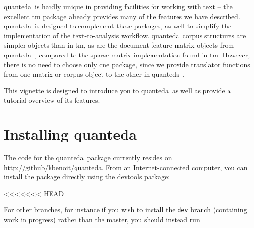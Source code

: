 \documentclass[11pt]{article}
\newcommand{\quanteda}{\textsf{quanteda}\ }
\begin{document}
\quanteda is hardly unique in providing facilities for working with
text -- the excellent \textsf{tm} package already provides many of the
features we have described.  \quanteda is designed to complement those
packages, as well to simplify the implementation of the
text-to-analysis workflow.  \quanteda corpus structures are simpler
objects than in \textsf{tm}, as are the document-feature matrix
objects from \quanteda, compared to the sparse matrix implementation
found in \textsf{tm}.  However, there is no need to choose only one
package, since we provide translator functions from one matrix or
corpus object to the other in \quanteda.

This vignette is designed to introduce you to \quanteda as well as
provide a tutorial overview of its features.

\section{Installing \quanteda}

The code for the \quanteda package currently resides on
\url{http://github/kbenoit/quanteda}.  From an Internet-connected
computer, you can install the package directly using the
\textsf{devtools} package:

<<<<<<< HEAD
\begin{knitrout}
\color{fgcolor}\begin{kframe}
\begin{alltt}
 \hlstd{(}\hlopt{!} \hlstd{(}\hlstd{,}  \hlstd{=} \hlstd{)}
\end{alltt}
\end{kframe}
\end{knitrout}


For other branches, for instance if you wish to install the
\texttt{dev} branch (containing work in progress) rather than the
master, you should instead run

\begin{knitrout}
\color{fgcolor}\begin{kframe}
\begin{alltt}
\hlstd{(}\hlstd{,}  \hlstd{=} \hlstd{,}  \hlstd{=} \hlstd{)}
\end{alltt}
\end{kframe}
\end{knitrout}
\end{document}
